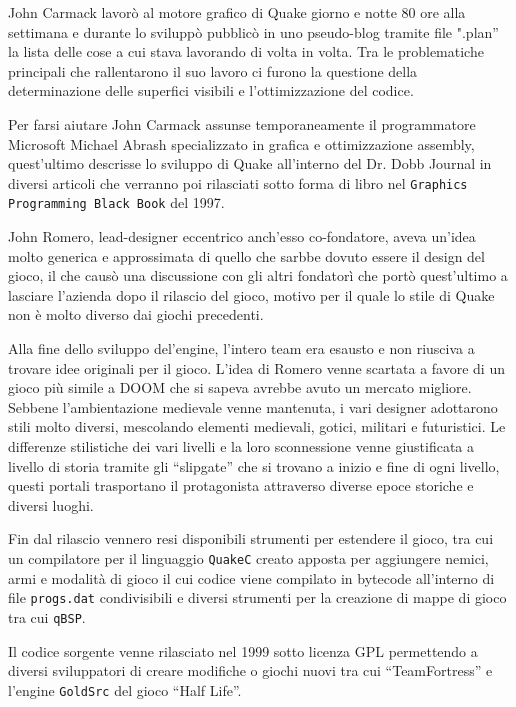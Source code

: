 \documentclass[12pt, letterpaper]{article}
\begin{document}
John Carmack lavorò al motore grafico di Quake giorno e notte 80 ore alla settimana e durante lo sviluppò pubblicò in uno pseudo-blog tramite file ".plan'' la lista delle cose a cui stava lavorando di volta in volta. Tra le problematiche principali che rallentarono il suo lavoro ci furono la questione della determinazione delle superfici visibili e l'ottimizzazione del codice.

Per farsi aiutare John Carmack assunse temporaneamente il programmatore Microsoft Michael Abrash specializzato in grafica e ottimizzazione assembly, quest'ultimo descrisse lo sviluppo di Quake all'interno del Dr. Dobb Journal in diversi articoli che verranno poi rilasciati sotto forma di libro nel \texttt{Graphics Programming Black Book} del 1997. \cite{abrash1997michael}

John Romero, lead-designer eccentrico anch'esso co-fondatore, aveva un'idea molto generica e approssimata di quello che sarbbe dovuto essere il design del gioco, il che causò una discussione con gli altri fondatorì che portò quest'ultimo a lasciare l'azienda dopo il rilascio del gioco, motivo per il quale lo stile di Quake non è molto diverso dai giochi precedenti.

Alla fine dello sviluppo del'engine, l'intero team era esausto e non riusciva a trovare idee originali per il gioco. L'idea di Romero venne scartata a favore di un gioco più simile a DOOM che si sapeva avrebbe avuto un mercato migliore. Sebbene l'ambientazione medievale venne mantenuta, i vari designer adottarono stili molto diversi, mescolando elementi medievali, gotici, militari e futuristici. Le differenze stilistiche dei vari livelli e la loro sconnessione venne giustificata a livello di storia tramite gli ``slipgate'' che si trovano a inizio e fine di ogni livello, questi portali trasportano il protagonista attraverso diverse epoce storiche e diversi luoghi.
\cite[Chapter~12]{kushner2004masters}

Fin dal rilascio vennero resi disponibili strumenti per estendere il gioco, tra cui un compilatore per il linguaggio \texttt{QuakeC} creato apposta per aggiungere nemici, armi e modalità di gioco il cui codice viene compilato in bytecode all'interno di file \texttt{progs.dat} condivisibili e diversi strumenti per la creazione di mappe di gioco tra cui \texttt{qBSP}.

Il codice sorgente venne rilasciato nel 1999 sotto licenza GPL \cite{idsoftware:quake} permettendo a diversi sviluppatori di creare modifiche o giochi nuovi tra cui ``TeamFortress'' e l'engine \texttt{GoldSrc} del gioco ``Half Life''.
\end{document}
